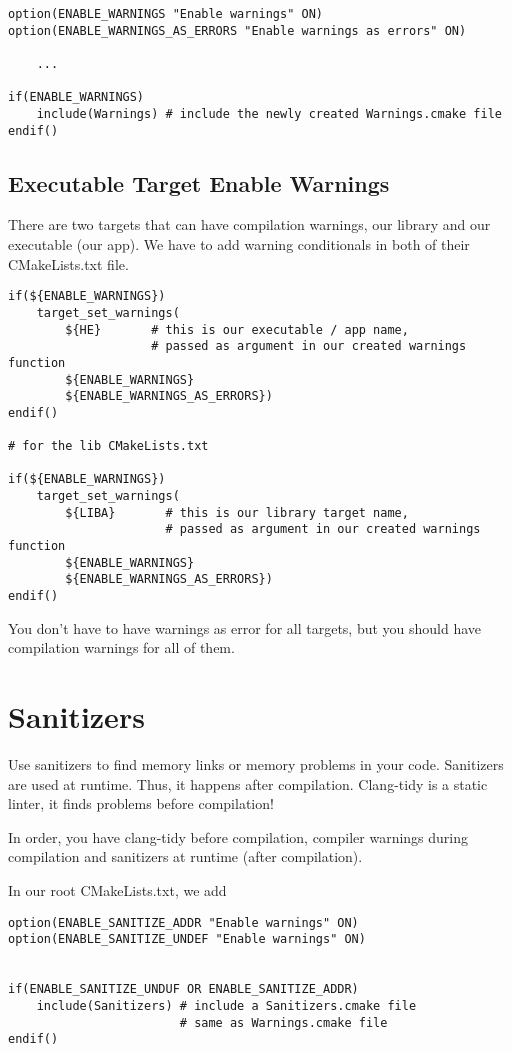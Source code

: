 \begin{verbatim}
option(ENABLE_WARNINGS "Enable warnings" ON)
option(ENABLE_WARNINGS_AS_ERRORS "Enable warnings as errors" ON)

    ...

if(ENABLE_WARNINGS)
    include(Warnings) # include the newly created Warnings.cmake file
endif()
\end{verbatim}


\subsection{Executable Target Enable Warnings}

There are two targets that can have compilation warnings, our library and our executable (our app). We have to 
add warning conditionals in both of their CMakeLists.txt file.

\begin{verbatim}
if(${ENABLE_WARNINGS})
    target_set_warnings(
        ${HE}       # this is our executable / app name,
                    # passed as argument in our created warnings function
        ${ENABLE_WARNINGS}
        ${ENABLE_WARNINGS_AS_ERRORS})
endif()

# for the lib CMakeLists.txt

if(${ENABLE_WARNINGS})
    target_set_warnings(
        ${LIBA}       # this is our library target name,
                      # passed as argument in our created warnings function
        ${ENABLE_WARNINGS}
        ${ENABLE_WARNINGS_AS_ERRORS})
endif()
\end{verbatim}

You don't have to have warnings as error for all targets, but you should have compilation warnings for all of them.

\section{Sanitizers}

Use sanitizers to find memory links or memory problems in your code. Sanitizers are used at runtime. 
Thus, it happens after compilation. Clang-tidy is a static linter, it finds problems before compilation!  

In order, you have clang-tidy before compilation, 
compiler warnings during compilation and sanitizers at runtime (after compilation).

In our root CMakeLists.txt, we add

\begin{verbatim}
option(ENABLE_SANITIZE_ADDR "Enable warnings" ON)
option(ENABLE_SANITIZE_UNDEF "Enable warnings" ON)


if(ENABLE_SANITIZE_UNDUF OR ENABLE_SANITIZE_ADDR)
    include(Sanitizers) # include a Sanitizers.cmake file
                        # same as Warnings.cmake file
endif()

\end{verbatim}

